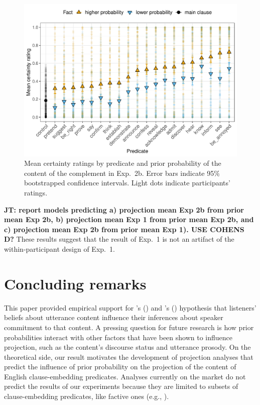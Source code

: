 \documentclass[11pt,fleqn]{article}
\newcommand{\jt}[1]{\textbf{\color{blue}JT: #1}}
\newcommand{\6}{\mbox{$[\hspace*{-.6mm}[$}}
\newcommand{\9}{\mbox{$]\hspace*{-.6mm}]$}}
\newcommand{\citetpos}[1]{\citeauthor{#1}'s (\citeyear{#1})}
\begin{document}
\begin{figure}[h!]
\centering

\includegraphics[width=.7\paperwidth]{../../results/3-projectivity/graphs/means-projectivity-by-predicate-and-prior}

\caption{Mean certainty ratings by predicate and prior probability of the content of the complement in Exp.~2b. Error bars indicate 95\% bootstrapped confidence intervals. Light dots indicate participants' ratings.} 
\label{f-projection-mean-2b}
\end{figure}


\jt{report models predicting a) projection mean Exp 2b from prior mean Exp 2b, b) projection mean Exp 1 from prior mean Exp 2b, and c) projection mean Exp 2b from prior mean Exp 1). USE COHENS D?} These results suggest that the result of Exp.~1 is not an artifact of the within-participant design of Exp.~1.

\section{Concluding remarks}\label{s4}

This paper provided empirical support for \citetpos{stevens-etal2017} and \citetpos{tbd-variability} hypothesis that listeners' beliefs about utterance content influence their inferences about speaker commitment to that content. A pressing question for future research is how prior probabilities interact with other factors that have been shown to influence projection, such as the content's discourse status and utterance prosody. On the theoretical side, our result motivates the development of projection analyses that predict the influence of prior probability on the projection of the content of English clause-embedding predicates. Analyses currently on the market do not predict the results of our experiments  because they are limited to subsets of clause-embedding predicates, like factive ones (e.g., ).
\end{document}

